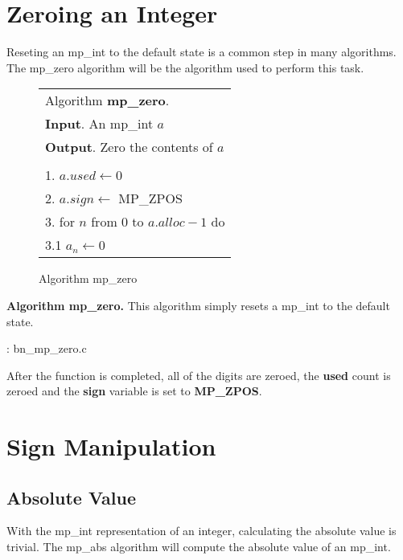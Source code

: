 \documentclass[b5paper]{book}
\begin{document}
\section{Zeroing an Integer}
Reseting an mp\_int to the default state is a common step in many algorithms.  The mp\_zero algorithm will be the algorithm used to
perform this task.

\begin{figure}[here]
\begin{center}
\begin{tabular}{l}
\hline Algorithm \textbf{mp\_zero}. \\
\textbf{Input}.   An mp\_int $a$ \\
\textbf{Output}.  Zero the contents of $a$ \\
\hline \\
1.  $a.used \leftarrow 0$ \\
2.  $a.sign \leftarrow$ MP\_ZPOS \\
3.  for $n$ from 0 to $a.alloc - 1$ do \\
\hspace{3mm}3.1  $a_n \leftarrow 0$ \\
\hline
\end{tabular}
\end{center}
\caption{Algorithm mp\_zero}
\end{figure}

\textbf{Algorithm mp\_zero.}
This algorithm simply resets a mp\_int to the default state.  

\vspace{+3mm}\begin{small}
\hspace{-5.1mm}{\bf File}: bn\_mp\_zero.c
\vspace{-3mm}
\begin{alltt}
\end{alltt}
\end{small}

After the function is completed, all of the digits are zeroed, the \textbf{used} count is zeroed and the 
\textbf{sign} variable is set to \textbf{MP\_ZPOS}.

\section{Sign Manipulation}
\subsection{Absolute Value}
With the mp\_int representation of an integer, calculating the absolute value is trivial.  The mp\_abs algorithm will compute
the absolute value of an mp\_int.
\end{document}
